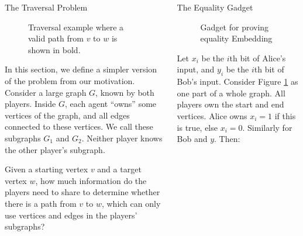 \begin{columns}[T]
\begin{block}{The Traversal Problem}
\begin{figure}
\begin{tikzpicture}[scale=2.2]
\end{tikzpicture}

\caption{Traversal example where a valid path from $v$ to $w$ is shown in bold.}
\end{figure}


\vspace{0.3em}
In this section, we define a simpler version of the problem from our motivation. Consider a large graph $G$, known by both players. Inside $G$, each agent “owns” some vertices of the graph, and all edges connected to these vertices. We call these subgraphs $G_1$ and $G_2$. Neither player knows the other player's subgraph.

Given a starting vertex $v$ and a target vertex $w$, how much information do
the players need to share to determine whether there is a
path from $v$ to $w$, which can only use vertices and edges in the players'
subgraphs?

\end{block}

\begin{block}{ The Equality Gadget}

\begin{figure}[H]
\caption{Gadget for proving equality Embedding}
\label{fig:equality_gadget}
\end{figure}

Let $x_i$ be the $i$th bit of Alice's input, and $y_i$ be the $i$th bit of Bob's input. Consider Figure \ref{fig:equality_gadget} as one part of a whole graph. All players own the start and end vertices. Alice owns $x_i=1$ if this is true, else $x_i=0$. Similarly for Bob and $y$. Then:


\end{block}
\end{columns}
